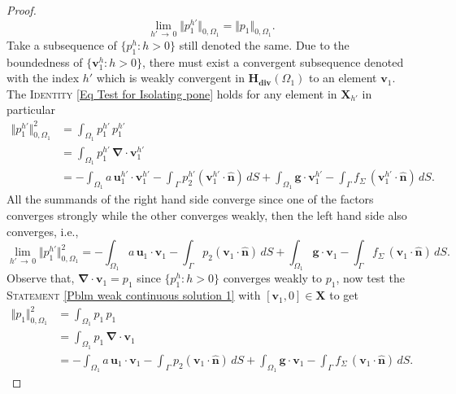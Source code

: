\documentclass[3p]{elsarticle}
\def\X{\mathbf X}
\def\g{\mathbf g}
\def\n{\bm{\widehat{ n} } }
\def\div{\bm{\nabla} \cdot}
\def\uone{\mathbf{u}_{1}}
\def\uonehp{\mathbf{u}_{1}^{h'}}
\def\Hdiv{\mathbf{H_{div}}}
\def\vone{\mathbf{v}_{1}}
\def\voneh{\mathbf{v}_{1}^{h}}
\def\vonehp{\mathbf{v}_{1}^{h'}}
\def\pone{p_{1}}
\def\poneh{p_{1}^{h}}
\def\ponehp{p_{1}^{h'}}
\def\ptwo{p_{2}}
\def\ptwohp{p_{2}^{h'}}
\def\stress{f_{\Sigma } }
\begin{document}
\begin{proof}
%
\begin{equation}\label{Eq Norms Limit Pressure One}
\lim\limits_{h'\,\rightarrow\, 0}\Vert \ponehp \Vert_{0, \Omega_{1}} = \Vert \pone\Vert_{0, \Omega_{1}} .
\end{equation}
%
Take a subsequence of $ \big\{ \poneh: h > 0\big\} $ still denoted the same. Due to the boundedness of $ \big\{ \voneh: h > 0\big\} $, there must exist a convergent subsequence denoted with the index $ h' $ which is weakly convergent in $ \Hdiv(\Omega_{1}) $ to an element $ \vone $. The \textsc{Identity} \eqref{Eq Test for Isolating pone} holds for any element in $ \X_{h'} $ in particular  
\begin{equation*}%
\begin{split}
\Vert \ponehp \Vert_{0, \Omega_{1}}^{2} & = \int_{\Omega_1} \ponehp \,\ponehp\, \\
& = 
\int_{\Omega_1} \ponehp \,\div\vonehp\, \\
& =
-\int_{\Omega_1}  a \, \uonehp \cdot \vonehp 
-\int_{\,\Gamma}\ptwohp \left(\vonehp\cdot\n\right)\, d S 
+ \int_{\Omega_{1}} \g \cdot \vonehp
- \int_{\Gamma} \stress\, (\vonehp\cdot\n)\, dS  .
\end{split}
\end{equation*}
%
All the summands of the right hand side converge since one of the factors converges strongly while the other converges weakly, then the left hand side also converges, i.e.,
\begin{equation*}%
\lim\limits_{h'\,\rightarrow\, 0}\Vert \ponehp \Vert_{0, \Omega_{1}}^{2}
=
-\int_{\Omega_1}  a \, \uone \cdot \vone 
-\int_{\,\Gamma}\ptwo \left(\vone\cdot\n\right)\, d S 
+ \int_{\Omega_{1}} \g \cdot \vone
- \int_{\Gamma} \stress\, (\vone\cdot\n)\, dS  .
\end{equation*}
%
Observe that, $ \div \vone = \pone $ since $ \big\{ \poneh: h > 0\big\} $ converges weakly to $ \pone $, now test the \textsc{Statement} \eqref{Pblm weak continuous solution 1} with $ [\vone, 0]\in \X $ to get
\begin{equation*}%
\begin{split}
\Vert \pone\Vert_{0, \Omega_{1}}^{2} & = 
\int_{\Omega_1} \pone \,\pone \\
& = \int_{\Omega_1} \pone \,\div\vone\,\\
& =
-\int_{\Omega_1}  a \, \uone \cdot \vone 
-\int_{\,\Gamma}\ptwo \left(\vone\cdot\n\right)\, d S 
+ \int_{\Omega_{1}} \g \cdot \vone
- \int_{\Gamma} \stress\, (\vone\cdot\n)\, dS  .

\end{split}
\end{equation*}
\end{proof}
\end{document}
